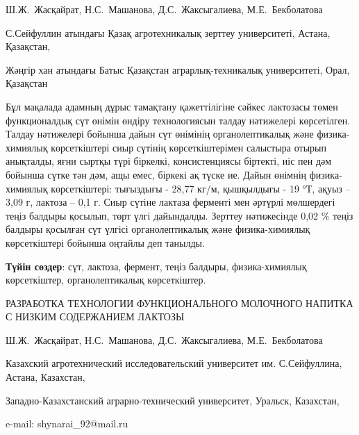 
\begin{header}

Ш.Ж.~Жасқайрат\envelope,
Н.С.~Машанова,
Д.С.~Жаксыгалиева,
М.Е.~Бекболатова
\end{header}

\begin{affil}
С.Сейфуллин атындағы Қазақ агротехникалық зерттеу университеті, Астана, Қазақстан,

Жәңгір хан атындағы Батыс Қазақстан аграрлық-техникалық университеті, Орал, Қазақстан

\end{affil}

Бұл мақалада адамның дұрыс тамақтану қажеттілігіне сәйкес лактозасы
төмен функционалдық сүт өнімін өндіру технологиясын талдау нәтижелері
көрсетілген. Талдау нәтижелері бойынша дайын сүт өнімінің
органолептикалық және физика-химиялық көрсеткіштері сиыр сүтінің
көрсеткіштерімен салыстыра отырып анықталды, яғни сыртқы түрі біркелкі,
консистенциясы біртекті, иіс пен дәм бойынша сүтке тән дәм, ащы емес,
біркекі ақ түске ие. Дайын өнімнің физика-химиялық көрсеткіштері:
тығыздығы - 28,77 \(кг\)/м, қышқылдығы - 19 °Т, ақуыз
-- 3,09 г, лактоза -- 0,1 г. Сиыр сүтіне лактаза ферменті мен әртүрлі
мөлшердегі теңіз балдыры қосылып, төрт үлгі дайындалды. Зерттеу
нәтижесінде 0,02 \% теңіз балдыры қосылған сүт үлгісі органолептикалық
және физика-химиялық көрсеткіштері бойынша оңтайлы деп танылды.

{\bfseries Түйін сөздер}: сүт, лактоза, фермент, теңіз балдыры,
физика-химиялық көрсеткіштер, органолептикалық көрсеткіштер.

\begin{header}
РАЗРАБОТКА ТЕХНОЛОГИИ ФУНКЦИОНАЛЬНОГО МОЛОЧНОГО НАПИТКА С НИЗКИМ СОДЕРЖАНИЕМ ЛАКТОЗЫ

Ш.Ж.~Жасқайрат\envelope,
Н.С.~Машанова,
Д.С.~Жаксыгалиева,
М.Е.~Бекболатова
\end{header}

\begin{affil}
Казахский агротехнический исследовательский университет им. С.Сейфуллина, Астана, Казахстан,

Западно-Казахстанский аграрно-технический университет, Уральск, Казахстан,

e-mail: shynarai\_92@mail.ru
\end{affil}

